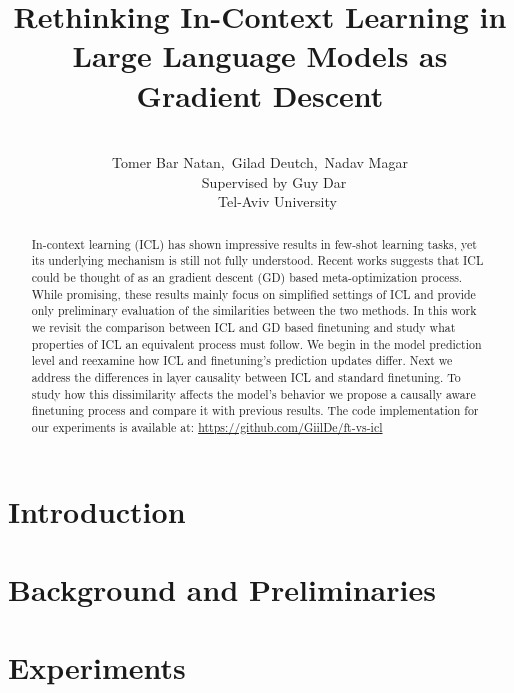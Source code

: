 \documentclass[11pt]{article}
\title{Rethinking In-Context Learning in Large Language Models as Gradient Descent}
\author{\\
Tomer Bar Natan,~Gilad Deutch,~Nadav Magar\\
~~~~Supervised by Guy Dar\\
~~~~~Tel-Aviv University}
\date{}
\begin{document}
\maketitle

\begin{abstract}
	In-context learning (ICL) has shown impressive results in few-shot learning tasks, yet its underlying mechanism is still not fully understood.
	Recent works suggests that ICL could be thought of as an gradient descent (GD) based meta-optimization process.
	While promising, these results mainly focus on simplified settings of ICL and provide only preliminary evaluation of the similarities between the two methods. 
	In this work we revisit the comparison between ICL and GD based finetuning and study what properties of ICL an equivalent process must follow. 
	We begin in the model prediction level and reexamine how ICL and finetuning's prediction updates differ.
	Next we address the differences in layer causality between ICL and standard finetuning.
	To study how this dissimilarity affects the model's behavior we propose a causally aware finetuning process and compare it with previous results. 
	The code implementation for our experiments is available at:
	\href{https://github.com/GiilDe/ft-vs-icl}{https://github.com/GiilDe/ft-vs-icl}
\end{abstract}

\section{Introduction}


\section{Background and Preliminaries}



\section{Experiments}

\end{document}
